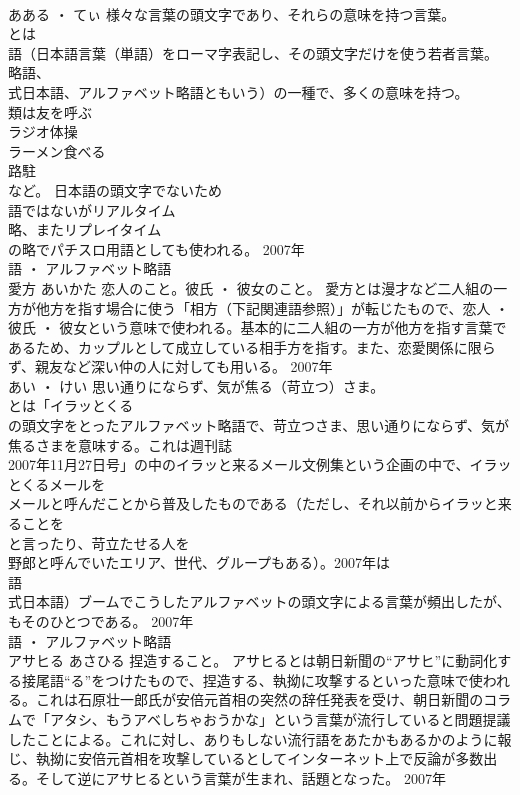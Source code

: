 \documentclass[8pt]{extreport}
\begin{document}
\begin{CJK}{UTF8}{min}
\\	あある ・ てぃ	様々な言葉の頭文字であり、それらの意味を持つ言葉。	
\\	とは
\\	語（日本語言葉（単語）をローマ字表記し、その頭文字だけを使う若者言葉。
\\	略語、
\\	式日本語、アルファベット略語ともいう）の一種で、多くの意味を持つ。
\\	類は友を呼ぶ
\\	ラジオ体操
\\	ラーメン食べる
\\	路駐
\\	など。 日本語の頭文字でないため
\\	語ではないがリアルタイム
\\	略、またリプレイタイム
\\	の略でパチスロ用語としても使われる。	2007年	
\\	語 ・ アルファベット略語	
\\	愛方	あいかた	恋人のこと。彼氏 ・ 彼女のこと。	愛方とは漫才など二人組の一方が他方を指す場合に使う「相方（下記関連語参照）」が転じたもので、恋人 ・ 彼氏 ・ 彼女という意味で使われる。基本的に二人組の一方が他方を指す言葉であるため、カップルとして成立している相手方を指す。また、恋愛関係に限らず、親友など深い仲の人に対しても用いる。	2007年	
\\	あい ・ けい	思い通りにならず、気が焦る（苛立つ）さま。	
\\	とは「イラッとくる
\\	の頭文字をとったアルファベット略語で、苛立つさま、思い通りにならず、気が焦るさまを意味する。これは週刊誌
\\	2007年11月27日号」の中のイラッと来るメール文例集という企画の中で、イラッとくるメールを
\\	メールと呼んだことから普及したものである（ただし、それ以前からイラッと来ることを
\\	と言ったり、苛立たせる人を
\\	野郎と呼んでいたエリア、世代、グループもある）。2007年は
\\	語
\\	式日本語）ブームでこうしたアルファベットの頭文字による言葉が頻出したが、
\\	もそのひとつである。	2007年	
\\	語 ・ アルファベット略語	
\\	アサヒる	あさひる	捏造すること。	アサヒるとは朝日新聞の“アサヒ”に動詞化する接尾語“る”をつけたもので、捏造する、執拗に攻撃するといった意味で使われる。これは石原壮一郎氏が安倍元首相の突然の辞任発表を受け、朝日新聞のコラムで「アタシ、もうアベしちゃおうかな」という言葉が流行していると問題提議したことによる。これに対し、ありもしない流行語をあたかもあるかのように報じ、執拗に安倍元首相を攻撃しているとしてインターネット上で反論が多数出る。そして逆にアサヒるという言葉が生まれ、話題となった。	2007年	

\end{CJK}
\end{document}
